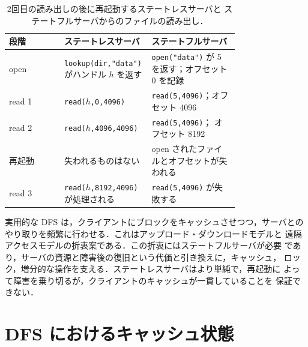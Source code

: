\documentclass[../main.tex]{subfiles}
\begin{document}
\begin{table}[htbp]
  \centering
  \caption{2回目の読み出しの後に再起動するステートレスサーバと
    ステートフルサーバからのファイルの読み出し．}
  \label{tab:l14-state-ex}
  \small
  \begin{tabular}{@{}l>{\raggedright\arraybackslash}p{0.38\linewidth}>{\raggedright\arraybackslash}p{0.38\linewidth}@{}}
    \toprule
    段階 & ステートレスサーバ & ステートフルサーバ \\
    \midrule
    open & \texttt{lookup(dir,"data")} がハンドル $h$ を返す &
      \texttt{open("data")} が 5 を返す；オフセット 0 を記録 \\
    read 1 & \texttt{read($h$,0,4096)} & \texttt{read(5,4096)}；オフセット
      4096 \\
    read 2 & \texttt{read($h$,4096,4096)} & \texttt{read(5,4096)}；
      オフセット 8192 \\
    再起動 & 失われるものはない & open されたファイルとオフセットが失われる \\
    read 3 & \texttt{read($h$,8192,4096)} が処理される &
      \texttt{read(5,4096)} が失敗する \\
    \bottomrule
  \end{tabular}
\end{table}

\begin{keypoint}
  実用的な DFS は，クライアントにブロックをキャッシュさせつつ，サーバとの
  やり取りを頻繁に行わせる．これはアップロード・ダウンロードモデルと
  遠隔アクセスモデルの折衷案である．この折衷にはステートフルサーバが必要
  であり，サーバの資源と障害後の復旧という代価と引き換えに，キャッシュ，
  ロック，増分的な操作を支える．ステートレスサーバはより単純で，再起動に
  よって障害を乗り切るが，クライアントのキャッシュが一貫していることを
  保証できない．
\end{keypoint}

\section{DFS におけるキャッシュ状態}
\label{sec:l14-caching}
\end{document}
